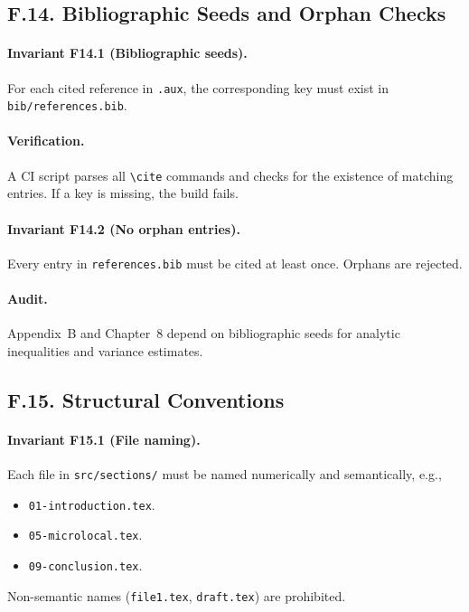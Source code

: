\subsection*{F.14. Bibliographic Seeds and Orphan Checks}

\paragraph{Invariant F14.1 (Bibliographic seeds).} For each cited reference in \texttt{.aux}, the corresponding key must exist in \texttt{bib/references.bib}.

\paragraph{Verification.} A CI script parses all \texttt{\textbackslash cite} commands and checks for the existence of matching entries. If a key is missing, the build fails.

\paragraph{Invariant F14.2 (No orphan entries).} Every entry in \texttt{references.bib} must be cited at least once. Orphans are rejected.

\paragraph{Audit.} Appendix~B and Chapter~8 depend on bibliographic seeds for analytic inequalities and variance estimates.

\subsection*{F.15. Structural Conventions}

\paragraph{Invariant F15.1 (File naming).} Each file in \texttt{src/sections/} must be named numerically and semantically, e.g.,
\begin{itemize}
    \item \texttt{01-introduction.tex}.
    \item \texttt{05-microlocal.tex}.
    \item \texttt{09-conclusion.tex}.
\end{itemize}
Non-semantic names (\texttt{file1.tex}, \texttt{draft.tex}) are prohibited.

